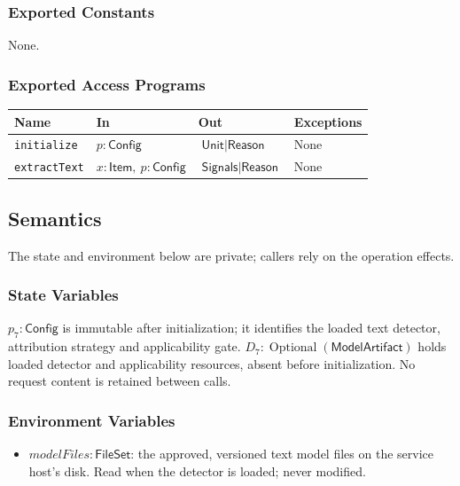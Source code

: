\documentclass[12pt, titlepage]{article}
\newcommand{\ty}[1]{\textsf{#1}}
\begin{document}
\subsubsection{Exported Constants}

None.

\subsubsection{Exported Access Programs}

\begin{center}
\begin{tabular}{p{3.3cm} p{4cm} p{4cm} p{2.4cm}}
\hline
\textbf{Name} & \textbf{In} & \textbf{Out} & \textbf{Exceptions} \\
\hline
\texttt{initialize} & $p:\ty{Config}$ & $\ty{Unit}\mid\ty{Reason}$ & None \\
\texttt{extractText} & $x:\ty{Item},\ p:\ty{Config}$ & $\ty{Signals}\mid\ty{Reason}$ & None \\
\hline
\end{tabular}
\end{center}

\subsection{Semantics}

The state and environment below are private; callers rely on the operation effects.

\subsubsection{State Variables}

$p_7:\ty{Config}$ is immutable after initialization; it identifies the loaded text detector, attribution strategy and applicability gate. $D_7:\operatorname{Optional}(\ty{ModelArtifact})$ holds loaded detector and applicability resources, absent before initialization. No request content is retained between calls.

\subsubsection{Environment Variables}

\begin{itemize}
\item $\mathit{modelFiles}:\ty{FileSet}$: the approved, versioned text model files on the service host's disk. Read when the detector is loaded; never modified.
\end{itemize}
\end{document}
